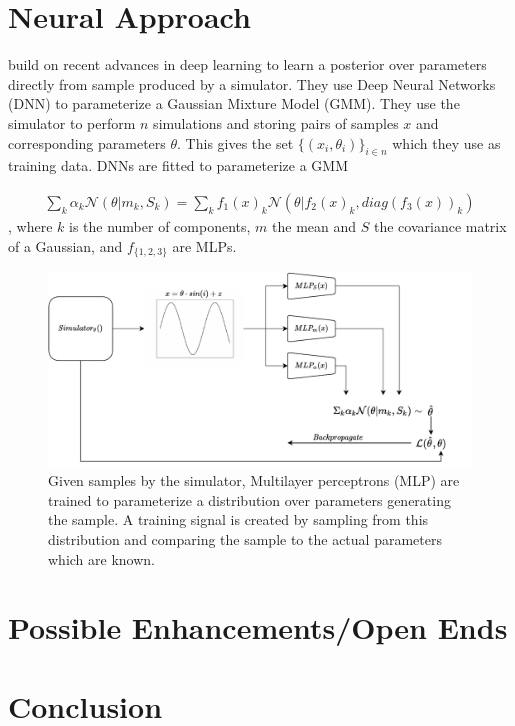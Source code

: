 \documentclass[12pt]{article}
\begin{document}
 



\section*{Neural Approach}
\citet{papamakarios2016fast} build on recent advances in deep learning to learn a posterior over parameters directly from sample produced by a simulator. They use Deep Neural Networks (DNN) to parameterize a Gaussian Mixture Model (GMM). They use the simulator to perform $n$ simulations and storing pairs of samples $x$ and corresponding parameters $\theta$. This gives the set $\lbrace(x_i,\theta_i)\rbrace_{i \in n}$ which they use as training data. DNNs are fitted to parameterize a GMM

\begin{align}
	\sum_k \alpha_k \mathcal{N}(\theta|m_k, S_k) = \sum_k f_1(x)_k \mathcal{N}(\theta|f_2(x)_k, diag(f_3(x))_k)
\end{align}
, where $k$ is the number of components, $m$ the mean and $S$ the covariance matrix of a Gaussian, and $f_{\lbrace 1,2,3 \rbrace}$ are MLPs.


\begin{figure}
	\centering
	\includegraphics[width=.8\linewidth]{figures/sbi_vis.pdf}
	\caption{Given samples by the simulator, Multilayer perceptrons (MLP) are trained to parameterize a distribution over parameters generating the sample. A training signal is created by sampling from this distribution and comparing the sample to the actual parameters which are known.}
\end{figure} 

\section*{Possible Enhancements/Open Ends}
\section*{Conclusion}







\end{document}
